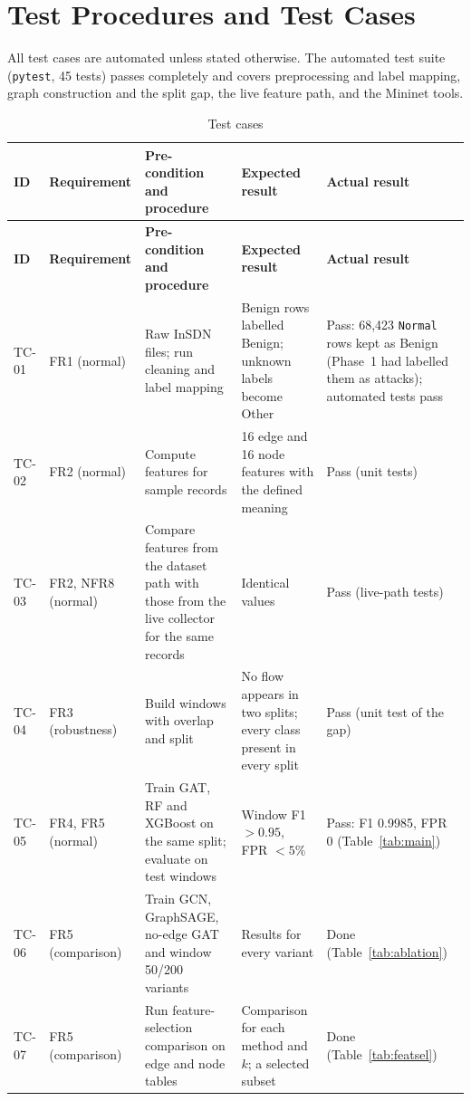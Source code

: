 \section{Test Procedures and Test Cases}

All test cases are automated unless stated otherwise. The automated test suite (\texttt{pytest}, 45 tests) passes completely and covers preprocessing and label mapping, graph construction and the split gap, the live feature path, and the Mininet tools.

\begin{longtable}{|p{1.2cm}|p{2.6cm}|p{3.1cm}|p{3.6cm}|p{3.0cm}|}
\caption{Test cases}\label{tab:tc}\\
\hline
\textbf{ID} & \textbf{Requirement} & \textbf{Pre-condition and procedure} & \textbf{Expected result} & \textbf{Actual result} \\ \hline
\endfirsthead
\hline \textbf{ID} & \textbf{Requirement} & \textbf{Pre-condition and procedure} & \textbf{Expected result} & \textbf{Actual result} \\ \hline
\endhead
TC-01 & FR1 (normal) & Raw InSDN files; run cleaning and label mapping & Benign rows labelled Benign; unknown labels become Other & Pass: 68,423 \texttt{Normal} rows kept as Benign (Phase~1 had labelled them as attacks); automated tests pass \\ \hline
TC-02 & FR2 (normal) & Compute features for sample records & 16 edge and 16 node features with the defined meaning & Pass (unit tests) \\ \hline
TC-03 & FR2, NFR8 (normal) & Compare features from the dataset path with those from the live collector for the same records & Identical values & Pass (live-path tests) \\ \hline
TC-04 & FR3 (robustness) & Build windows with overlap and split & No flow appears in two splits; every class present in every split & Pass (unit test of the gap) \\ \hline
TC-05 & FR4, FR5 (normal) & Train GAT, RF and XGBoost on the same split; evaluate on test windows & Window F1 $>0.95$, FPR $<5\%$ & Pass: F1 0.9985, FPR 0 (Table~\ref{tab:main}) \\ \hline
TC-06 & FR5 (comparison) & Train GCN, GraphSAGE, no-edge GAT and window 50/200 variants & Results for every variant & Done (Table~\ref{tab:ablation}) \\ \hline
TC-07 & FR5 (comparison) & Run feature-selection comparison on edge and node tables & Comparison for each method and $k$; a selected subset & Done (Table~\ref{tab:featsel}) \\ \hline

\end{longtable}
